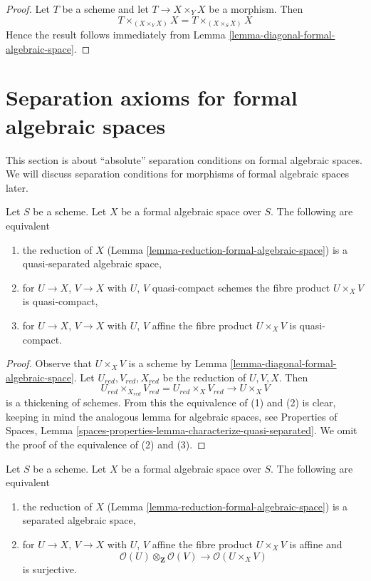 \begin{proof}
Let $T$ be a scheme and let $T \to X \times_Y X$ be a morphism.
Then
$$
T \times_{(X \times_Y X)} X = T \times_{(X \times_S X)} X
$$
Hence the result follows immediately from
Lemma \ref{lemma-diagonal-formal-algebraic-space}.
\end{proof}






\section{Separation axioms for formal algebraic spaces}
\label{section-separation}

\noindent
This section is about ``absolute'' separation conditions on formal algebraic
spaces. We will discuss separation conditions for morphisms of formal
algebraic spaces later.

\begin{lemma}
\label{lemma-characterize-quasi-separated}
Let $S$ be a scheme. Let $X$ be a formal algebraic space over $S$.
The following are equivalent
\begin{enumerate}
\item the reduction of $X$
(Lemma \ref{lemma-reduction-formal-algebraic-space}) is a
quasi-separated algebraic space,
\item for $U \to X$, $V \to X$ with $U$, $V$ quasi-compact schemes
the fibre product $U \times_X V$ is quasi-compact,
\item for $U \to X$, $V \to X$ with $U$, $V$ affine
the fibre product $U \times_X V$ is quasi-compact.
\end{enumerate}
\end{lemma}

\begin{proof}
Observe that $U \times_X V$ is a scheme by
Lemma \ref{lemma-diagonal-formal-algebraic-space}.
Let $U_{red}, V_{red}, X_{red}$ be the reduction of $U, V, X$.
Then
$$
U_{red} \times_{X_{red}} V_{red} = U_{red} \times_X V_{red} \to U \times_X V
$$
is a thickening of schemes. From this the equivalence of (1) and (2)
is clear, keeping in mind the analogous lemma for algebraic spaces, see
Properties of Spaces, Lemma
\ref{spaces-properties-lemma-characterize-quasi-separated}.
We omit the proof of the equivalence of (2) and (3).
\end{proof}

\begin{lemma}
\label{lemma-characterize-separated}
Let $S$ be a scheme. Let $X$ be a formal algebraic space over $S$.
The following are equivalent
\begin{enumerate}
\item the reduction of $X$
(Lemma \ref{lemma-reduction-formal-algebraic-space}) is a separated
algebraic space,
\item for $U \to X$, $V \to X$ with $U$, $V$ affine
the fibre product $U \times_X V$ is affine and
$$
\mathcal{O}(U) \otimes_\mathbf{Z} \mathcal{O}(V)
\longrightarrow
\mathcal{O}(U \times_X V)
$$
is surjective.
\end{enumerate}
\end{lemma}

